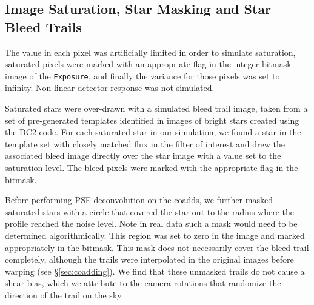 \documentclass[twocolumn,twocolappendix,astrosym]{openjournal}
\newcommand{\calexp}{\texttt{Exposure}}
\begin{document}
\subsection{Image Saturation, Star Masking and Star Bleed Trails} \label{sec:sim:satbleeds}

The value in each pixel was artificially limited in order to simulate
saturation, saturated pixels were marked with an appropriate flag in the
integer bitmask image of the \calexp, and finally the variance for those
pixels was set to infinity.  Non-linear detector response was not simulated.

Saturated stars were over-drawn with a simulated bleed trail image, taken from
a set of pre-generated templates identified in images of bright stars created
using the DC2 code.  For each saturated star in our simulation, we found a star
in the template set with closely matched flux in the filter of interest and
drew the associated bleed image directly over the star image with a value set
to the saturation level.  The bleed pixels were marked with the appropriate
flag in the bitmask.

Before performing PSF deconvolution on the coadds, we further masked
saturated stars with a circle that covered the star out to the radius
where the profile reached the noise level.  Note in real data such a mask would
need to be determined algorithmically. This region was set to zero in the image
and marked appropriately in the bitmask.   This mask does not necessarily cover
the bleed trail completely, although the trails were interpolated in the
original images before warping (see \S \ref{sec:coadding}).  We find that these
unmasked trails do not cause a shear bias, which we attribute to the camera
rotations that randomize the direction of the trail on the sky.
\end{document}
